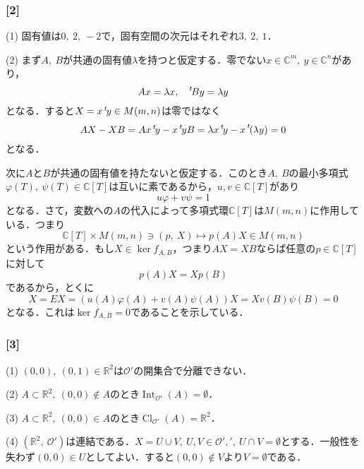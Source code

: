 \documentclass[a4j]{ltjsarticle}
\newcommand{\Rset}{\mathbb{R}}
\newcommand{\Cset}{\mathbb{C}}
\newcommand{\1}{\mathbbm{1}}
\newcommand{\transpose}[1]{\prescript{t\!}{}{#1}}
\DeclareMathOperator*{\interior}{\mathrm{Int}}
\DeclareMathOperator*{\closure}{\mathrm{Cl}}
\numberwithin{equation}{section}
\theoremstyle{definition}
\begin{document}
\subsubsection*{[2]}\label{am_2019_2}
(1) 固有値は$0,\ 2,\ -2$で，固有空間の次元はそれぞれ$3,\ 2,\ 1$．

(2) まず$A,\ B$が共通の固有値$\lambda$を持つと仮定する．零でない$x\in \Cset^m,\ y\in \Cset^n$があり，
\begin{equation}
    Ax=\lambda x,\quad \transpose{B}y=\lambda y    
\end{equation}
となる．すると$X=x\transpose{y}\in M(m,n)$は零ではなく
\begin{equation}
    AX-XB=Ax\transpose{y}-x\transpose{y}B=\lambda x\transpose{y}-x\transpose{(\lambda y)}=0
\end{equation}
となる．

次に$A$と$B$が共通の固有値を持たないと仮定する．このとき$A,\ B$の最小多項式$\varphi(T),\ \psi(T)\in \Cset[T]$は互いに素であるから，$u,v\in \Cset[T]$があり
\begin{equation}
    u\varphi+v\psi=1
\end{equation}
となる．さて，変数への$A$の代入によって多項式環$\Cset[T]$は$M(m,n)$に作用している．つまり
\begin{equation}
    \Cset[T]\times M(m,n)\ni(p,\ X)\mapsto p(A)X\in M(m,n)
\end{equation}
という作用がある．もし$X\in \ker f_{A,B}$，つまり$AX=XB$ならば任意の$p\in \Cset[T]$に対して
\begin{equation}
    p(A)X=X p(B)
\end{equation}
であるから，とくに
\begin{equation}
    X=EX=(u(A)\varphi(A)+v(A)\psi(A))X=Xv(B)\psi(B)=0 
\end{equation}
となる．これは$\ker f_{A,B}=0$であることを示している．
\subsubsection*{[3]}
(1) $(0,0),\ (0,1)\in\Rset^2$は$\mathcal{O}'$の開集合で分離できない．

(2) $A\subset\Rset^2,\ (0,0)\notin A$のとき$\interior_{\mathcal{O}'}(A)=\emptyset$．

(3) $A\subset \Rset^2,\ (0,0)\in A$のとき$\closure_{\mathcal{O}'}(A)=\Rset^2$．

(4) $(\Rset^2,\ \mathcal{O}')$は連結である．$X=U\cup V,\ U,V\in\mathcal{O}',',\ U\cap V=\emptyset$とする．一般性を失わず$(0,0)\in U$としてよい．すると$(0,0)\notin V$より$V=\emptyset$である．
\end{document}

